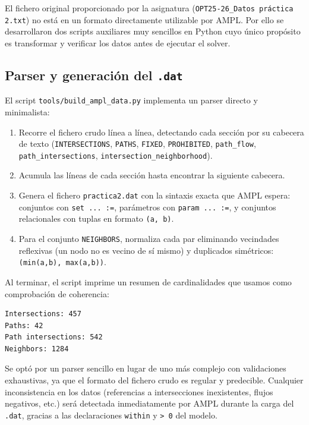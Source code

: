 \documentclass[12pt,a4paper]{article}
\begin{document}
El fichero original proporcionado por la asignatura (\texttt{OPT25-26\_Datos práctica 2.txt}) no está en un formato directamente utilizable por AMPL. Por ello se desarrollaron dos scripts auxiliares muy sencillos en Python cuyo único propósito es transformar y verificar los datos antes de ejecutar el solver.

\subsection{Parser y generación del \texttt{.dat}}

El script \texttt{tools/build\_ampl\_data.py} implementa un parser directo y minimalista:

\begin{enumerate}
    \item Recorre el fichero crudo línea a línea, detectando cada sección por su cabecera de texto (\texttt{INTERSECTIONS}, \texttt{PATHS}, \texttt{FIXED}, \texttt{PROHIBITED}, \texttt{path\_flow}, \texttt{path\_intersections}, \texttt{intersection\_neighborhood}).
    \item Acumula las líneas de cada sección hasta encontrar la siguiente cabecera.
    \item Genera el fichero \texttt{practica2.dat} con la sintaxis exacta que AMPL espera: conjuntos con \texttt{set ... :=}, parámetros con \texttt{param ... :=}, y conjuntos relacionales con tuplas en formato \texttt{(a, b)}.
    \item Para el conjunto \texttt{NEIGHBORS}, normaliza cada par eliminando vecindades reflexivas (un nodo no es vecino de sí mismo) y duplicados simétricos: \texttt{(min(a,b), max(a,b))}.
\end{enumerate}

Al terminar, el script imprime un resumen de cardinalidades que usamos como comprobación de coherencia:

\begin{lstlisting}[caption={Salida del parser}]
Intersections: 457
Paths: 42
Path intersections: 542
Neighbors: 1284
\end{lstlisting}

Se optó por un parser sencillo en lugar de uno más complejo con validaciones exhaustivas, ya que el formato del fichero crudo es regular y predecible. Cualquier inconsistencia en los datos (referencias a intersecciones inexistentes, flujos negativos, etc.) será detectada inmediatamente por AMPL durante la carga del \texttt{.dat}, gracias a las declaraciones \texttt{within} y \texttt{> 0} del modelo.
\end{document}
